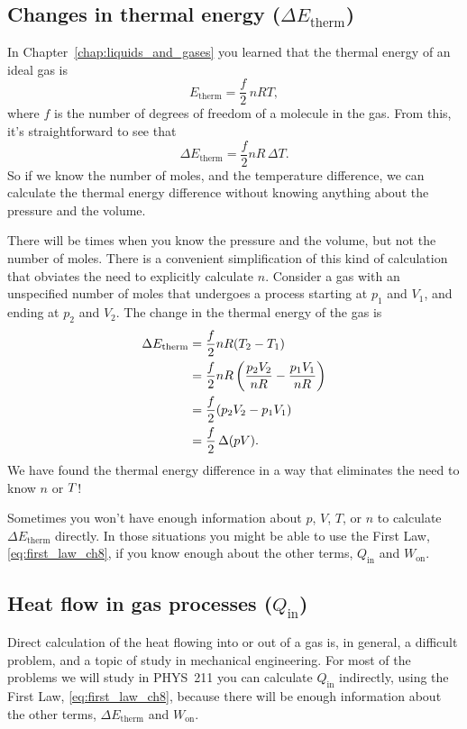 \subsection*{Changes in thermal energy ($\Delta E_\text{therm}$)}
In Chapter~\ref{chap:liquids_and_gases} you learned that the thermal 
energy of an ideal gas is
\begin{equation}
E_\text{therm} = \frac{f}{2}\, nRT,
\end{equation}
where $f$ is the number of degrees of freedom of a molecule in the gas.
From this, it's straightforward to see that
\begin{equation}
\Delta E_\text{therm} = \frac{f}{2} nR\, \Delta T.
\end{equation}
So if we know the number of moles, and the temperature difference, 
we can calculate the thermal energy difference without knowing 
anything about the pressure and the volume.

There will be times when you know the pressure and the volume, but not
the number of moles. 
There is a convenient simplification of this 
kind of  calculation that obviates the need to explicitly calculate $n$.
Consider a gas with an unspecified number of moles that undergoes 
a process starting at $p_1$ and $V_1$, and ending at $p_2$ and $V_2$.
The change in the thermal energy of the gas is
\begin{eqnarray}
\Delta E_\text{therm} =\mathstrut & \frac{f}{2}n R (T_2 - T_1)  \\
                      =\mathstrut &  \frac{f}{2}n R \left(\frac{p_2V_2}{nR} -
                                          \frac{p_1V_1}{nR} \right) \\
                      =\mathstrut &  \frac{f}{2}(p_2V_2 - p_1V_1)   \\
                      =\mathstrut & \frac{f}{2}\, \Delta(pV).
\label{eq:Etherm_from_pV}                            
\end{eqnarray}
We have found the thermal energy difference in a way that eliminates the 
need to know $n$ or $T\/$!

Sometimes you won't have enough information about $p$, $V$, $T$, or $n$
to calculate $\Delta E_\text{therm}$ directly.  In those situations 
you might be able to use the First Law, \eqref{eq:first_law_ch8}, if
you know enough about the other terms, $Q_\text{in}$ and $W_\text{on}$.

\subsection*{Heat flow in gas processes ($Q_\text{in}$)}
Direct calculation of the heat flowing into or out of a gas is, in 
general,  a difficult problem, and a topic of study in mechanical 
engineering.  For most 
of the problems we will study in PHYS~211 you can calculate $Q_\text{in}$
indirectly, using the First Law, \eqref{eq:first_law_ch8}, because
there will be enough information about the other terms, 
$\Delta E_\text{therm}$ and $W_\text{on}$.

